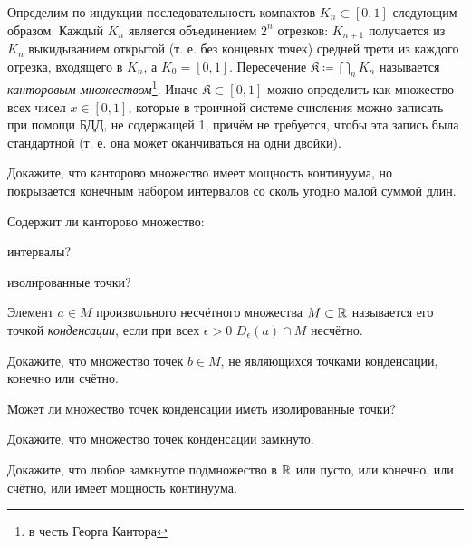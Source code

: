 \documentclass[a4paper, 12pt, num=28]{listok}
\begin{document}
\begin{definition}
	Определим по индукции последовательность компактов $K_n \subset \left [ 0, 1 \right ]$ следующим образом.
	Каждый $K_n$ является объединением $2^n$ отрезков: $K_{n + 1}$ получается из $K_n$ выкидыванием открытой
	(т. е. без концевых точек) средней трети из каждого отрезка, входящего в $K_n$, а $K_0 = \left [ 0, 1 \right ]$.
	Пересечение $\mathfrak{K} \coloneq \bigcap_n K_n$ называется \textit{канторовым множеством}\footnote{%
	в честь Георга Кантора
	}.
	Иначе $\mathfrak{K} \subset \left [ 0, 1 \right ]$ можно определить как множество всех чисел $x \in \left [ 0, 1 \right ]$,
	которые в троичной системе счисления можно записать при помощи БДД, не содержащей 1, причём не требуется, чтобы эта запись была стандартной
	(т. е. она может оканчиваться на одни двойки).
\end{definition}
\begin{problem}
	Докажите, что канторово множество имеет мощность континуума, но покрывается конечным набором интервалов со сколь угодно малой суммой длин.
\end{problem}
\begin{problem}
	Содержит ли канторово множество:
	\begin{probparts}
		\item интервалы?
		\item изолированные точки?
	\end{probparts}
\end{problem}
\begin{definition}
	Элемент $a \in M$ произвольного несчётного множества $M \subset \mathbb{R}$ называется его точкой \textit{конденсации}, если
	при всех $\epsilon > 0$ $D_{\epsilon}(a) \cap M$ несчётно.
\end{definition}
\begin{problem}[\hard]
	Докажите, что множество точек $b \in M$, не являющихся точками конденсации, конечно или счётно.
\end{problem}
\begin{problem}[\hard]
	Может ли множество точек конденсации иметь изолированные точки?
\end{problem}
\begin{problem}[\hard]
	Докажите, что множество точек конденсации замкнуто.
\end{problem}
\begin{problem}[\hard]
	Докажите, что любое замкнутое подмножество в $\mathbb{R}$ или пусто, или конечно, или счётно, или имеет мощность континуума.
\end{problem}
\end{document}

